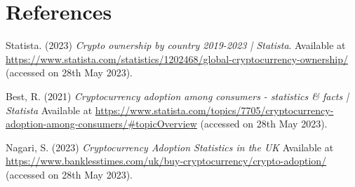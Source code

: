 \section{References}

\noindent [1] Statista. (2023) \textit{Crypto ownership by country 2019-2023 | Statista}. Available at \url{https://www.statista.com/statistics/1202468/global-cryptocurrency-ownership/} (accessed on 28th May 2023).
\vspace{0.2cm}

\noindent [2] Best, R. (2021) \textit{Cryptocurrency adoption among consumers - statistics \& facts | Statista} Available at \url{https://www.statista.com/topics/7705/cryptocurrency-adoption-among-consumers/#topicOverview} (accessed on 28th May 2023).
\vspace{0.2cm}

\noindent [3] Nagari, S. (2023) \textit{Cryptocurrency Adoption Statistics in the UK} Available at \url{https://www.banklesstimes.com/uk/buy-cryptocurrency/crypto-adoption/} (accessed on 28th May 2023).
\vspace{0.2cm}

\newpage